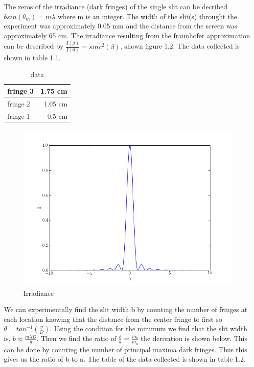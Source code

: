 \documentclass[paper=a4, fontsize=11pt]{scrartcl} %
\numberwithin{equation}{section} %
\numberwithin{figure}{section} %
\numberwithin{table}{section} %
\begin{document}
The zeros of the irradiance (dark fringes) of the single slit can be decribed $bsin(\theta_m) = m \lambda$  where m is an integer. The width of the slit(s) throught the experiment was approximately 0.05 mm and the distance from the screen was approximately 65 cm. The irradiance resulting from the fraunhofer approximation can be described by  $ \frac{I(\beta)}{I(0)} = sinc^2(\beta)$, shown figure 1.2.  The data collected is shown in table 1.1. 
\begin{table}
  \centering 
   \caption{data}
  \begin{tabular}{|l |r| }
    \hline
     fringe 3 & 1.75 cm \\ \hline
     fringe 2 & 1.05 cm \\ \hline
     fringe 1 & 0.5  cm \\  \hline
  \end{tabular}
\end{table}
\begin{figure}[H]
\centering
\includegraphics[scale =0.4]{fringes}
\caption{Irradiance}
\end{figure}
We can experimentally find the slit width b by counting the number of fringes at each location knowing that the distance from the center fringe to first so $\theta = tan^{-1}(\frac{y}{D})$. Using the condition for the minimum we find that the slit width is, $ b \approx \frac{m \lambda D}{y} $. Then we find the ratio of $\frac{b}{a} = \frac{m_b}{m_a}$ the derivation is shown below. This can be done by counting the number of principal maxima dark fringes. Thus this gives us the ratio of b to a. The table of the data collected is shown in table 1.2.
\end{document}
